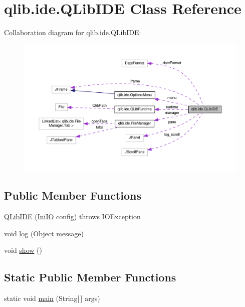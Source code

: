 \hypertarget{classqlib_1_1ide_1_1QLibIDE}{}\section{qlib.\+ide.\+Q\+Lib\+I\+DE Class Reference}
\label{classqlib_1_1ide_1_1QLibIDE}


Collaboration diagram for qlib.\+ide.\+Q\+Lib\+I\+DE\+:
\nopagebreak
\begin{figure}[H]
\begin{center}
\leavevmode
\includegraphics[width=350pt]{classqlib_1_1ide_1_1QLibIDE__coll__graph}
\end{center}
\end{figure}
\subsection*{Public Member Functions}
\begin{DoxyCompactItemize}
\item 
\hyperlink{classqlib_1_1ide_1_1QLibIDE_a3eafdf56320c066383975e5b2d22503a}{Q\+Lib\+I\+DE} (\hyperlink{classqlib_1_1ide_1_1IniIO}{Ini\+IO} config)  throws I\+O\+Exception
\item 
void \hyperlink{classqlib_1_1ide_1_1QLibIDE_aa0b95da9f912317b1497e190748733d6}{log} (Object message)
\item 
void \hyperlink{classqlib_1_1ide_1_1QLibIDE_a53bc0b691fd24d3e2dad2603cf086760}{show} ()
\end{DoxyCompactItemize}
\subsection*{Static Public Member Functions}
\begin{DoxyCompactItemize}
\item 
static void \hyperlink{classqlib_1_1ide_1_1QLibIDE_a4d8a71cb808c1796b48f83b05e3ca1b8}{main} (String\mbox{[}$\,$\mbox{]} args)
\end{DoxyCompactItemize}
